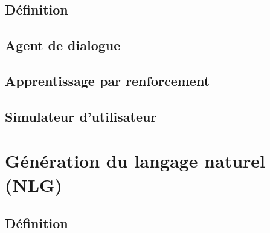 	\subsection{Définition}
		\paragraph{}
	\subsection{Agent de dialogue}
		\paragraph{}
	\subsection{Apprentissage par renforcement}
		\paragraph{}
	\subsection{Simulateur d’utilisateur}
		\paragraph{}

\section{Génération du langage naturel (NLG)}
	\paragraph{}
	\subsection{Définition}
		\paragraph{}
	
